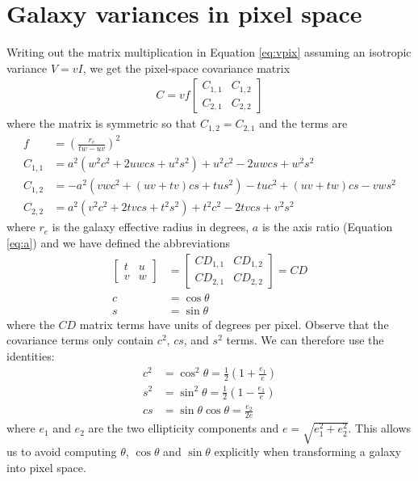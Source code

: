 \documentclass[11pt,preprint]{aastex}
\newcommand{\eqnref}[1]{Equation \ref{#1}}
\newcommand{\CD}{C\!D}
\begin{document}
\section{Galaxy variances in pixel space}
\label{app:transform}

Writing out the matrix multiplication in \eqnref{eq:vpix} assuming an
isotropic variance $V = v I$, we get the pixel-space covariance matrix
\begin{align}
C = v f \begin{bmatrix}
C_{1,1} & C_{1,2} \\
C_{2,1} & C_{2,2}
\end{bmatrix}
\end{align}
where the matrix is symmetric so that $C_{1,2} = C_{2,1}$ and the terms are
\begin{align}
f & = \left( \frac{r_e}{t w - u v} \right)^2
\\
C_{1,1} & =
%
a^2(w^2 c^2 + 2 u w c s + u^2 s^2) + u^2 c^2 - 2 u w c s + w^2 s^2
\\
C_{1,2} & =
%
-a^2 (v w c^2 + (u v + t v) c s + t u s^2) - t u c^2 + (u v + t w) c s - v w s^2
\\
C_{2,2} & =
%
a^2 (v^2 c^2 + 2 t v c s + t^2 s^2) + t^2 c^2 - 2 t v c s + v^2 s^2
\end{align}
where $r_e$ is the galaxy effective radius in degrees,
$a$ is the axis ratio (\eqnref{eq:a}) and
we have defined the abbreviations
\begin{align}
\begin{bmatrix}
t & u \\
v & w
\end{bmatrix}
& = 
\begin{bmatrix}
\CD_{1,1} & \CD_{1,2} \\
\CD_{2,1} & \CD_{2,2}
\end{bmatrix}
=
\CD
\\
c &= \cos \theta \\
s &= \sin \theta
\end{align}
where the $\CD$ matrix terms have units of degrees per pixel.
Observe that the covariance terms only contain $c^2$, $cs$, and $s^2$
terms.  We can therefore use the identities:
\begin{align}
c^2 & = \cos^2 \theta            =
\tfrac{1}{2} \left(1 + \frac{e_1}{e} \right) \\
s^2 & = \sin^2 \theta            =
\tfrac{1}{2} \left(1 - \frac{e_1}{e} \right) \\
cs  & = \sin \theta \cos \theta  = %
\frac{e_2}{2 e}
\end{align}
where $e_1$ and $e_2$ are the two ellipticity components and $e =
\sqrt{e_1^2 + e_2^2}$.  This allows us to avoid computing $\theta$,
$\cos \theta$ and $\sin \theta$ explicitly when transforming a galaxy
into pixel space.
\end{document}
